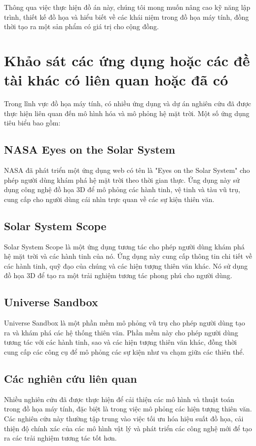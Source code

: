 \documentclass[14pt]{extarticle}
\begin{document}
Thông qua việc thực hiện đồ án này, chúng tôi mong muốn nâng cao kỹ năng lập trình, thiết kế đồ họa và hiểu biết về các khái niệm trong đồ họa máy tính, đồng thời tạo ra một sản phẩm có giá trị cho cộng đồng.
\section{Khảo sát các ứng dụng hoặc các đề tài khác có liên quan hoặc đã có}
Trong lĩnh vực đồ họa máy tính, có nhiều ứng dụng và dự án nghiên cứu đã được thực hiện liên quan đến mô hình hóa và mô phỏng hệ mặt trời. Một số ứng dụng tiêu biểu bao gồm:

\subsection{NASA Eyes on the Solar System}
NASA đã phát triển một ứng dụng web có tên là "Eyes on the Solar System" cho phép người dùng khám phá hệ mặt trời theo thời gian thực. Ứng dụng này sử dụng công nghệ đồ họa 3D để mô phỏng các hành tinh, vệ tinh và tàu vũ trụ, cung cấp cho người dùng cái nhìn trực quan về các sự kiện thiên văn.

\subsection{Solar System Scope}
Solar System Scope là một ứng dụng tương tác cho phép người dùng khám phá hệ mặt trời và các hành tinh của nó. Ứng dụng này cung cấp thông tin chi tiết về các hành tinh, quỹ đạo của chúng và các hiện tượng thiên văn khác. Nó sử dụng đồ họa 3D để tạo ra một trải nghiệm tương tác phong phú cho người dùng.

\subsection{Universe Sandbox}
Universe Sandbox là một phần mềm mô phỏng vũ trụ cho phép người dùng tạo ra và khám phá các hệ thống thiên văn. Phần mềm này cho phép người dùng tương tác với các hành tinh, sao và các hiện tượng thiên văn khác, đồng thời cung cấp các công cụ để mô phỏng các sự kiện như va chạm giữa các thiên thể.

\subsection{Các nghiên cứu liên quan}
Nhiều nghiên cứu đã được thực hiện để cải thiện các mô hình và thuật toán trong đồ họa máy tính, đặc biệt là trong việc mô phỏng các hiện tượng thiên văn. Các nghiên cứu này thường tập trung vào việc tối ưu hóa hiệu suất đồ họa, cải thiện độ chính xác của các mô hình vật lý và phát triển các công nghệ mới để tạo ra các trải nghiệm tương tác tốt hơn.
\end{document}
